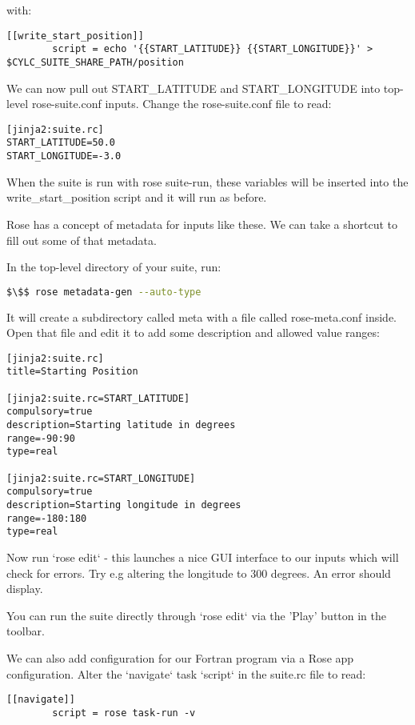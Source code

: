 with:

\lstset{language=suiterc}
\begin{lstlisting}[columns=fullflexible]
    [[write_start_position]]
        script = echo '{{START_LATITUDE}} {{START_LONGITUDE}}' > $CYLC_SUITE_SHARE_PATH/position
\end{lstlisting}

We can now pull out START\_LATITUDE and START\_LONGITUDE into top-level rose-suite.conf inputs. Change the rose-suite.conf file to read:

\lstset{language=suiterc}
\begin{lstlisting}[columns=fullflexible]
[jinja2:suite.rc]
START_LATITUDE=50.0
START_LONGITUDE=-3.0
\end{lstlisting}

When the suite is run with rose suite-run, these variables will be inserted into the write\_start\_position script and it will run as before.

Rose has a concept of metadata for inputs like these. We can take a shortcut to fill out some of that metadata.

In the top-level directory of your suite, run:

\begin{lstlisting}[mathescape, language=bash]
$\$$ rose metadata-gen --auto-type
\end{lstlisting}

It will create a subdirectory called meta with a file called rose-meta.conf inside. Open that file and edit it to add some description and allowed value ranges:

\lstset{language=suiterc}
\begin{lstlisting}[columns=fullflexible]
[jinja2:suite.rc]
title=Starting Position

[jinja2:suite.rc=START_LATITUDE]
compulsory=true
description=Starting latitude in degrees
range=-90:90
type=real

[jinja2:suite.rc=START_LONGITUDE]
compulsory=true
description=Starting longitude in degrees
range=-180:180
type=real
\end{lstlisting}
 
Now run `rose edit` - this launches a nice GUI interface to our inputs which will check for errors. Try e.g altering the longitude to 300 degrees. An error should display.

You can run the suite directly through `rose edit` via the 'Play' button in the toolbar.

We can also add configuration for our Fortran program via a Rose app configuration. Alter the `navigate` task `script` in the suite.rc file to read:
\lstset{language=suiterc}
\begin{lstlisting}[columns=fullflexible]
    [[navigate]]
        script = rose task-run -v
\end{lstlisting}

